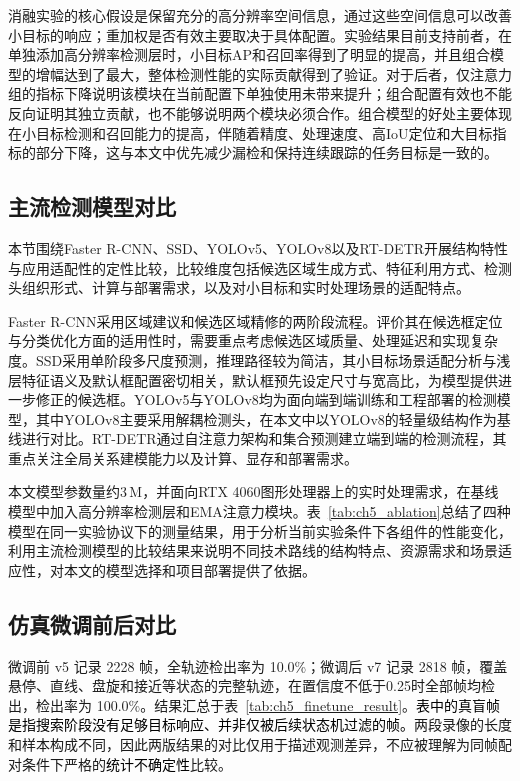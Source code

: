 消融实验的核心假设是保留充分的高分辨率空间信息，通过这些空间信息可以改善小目标的响应；重加权是否有效主要取决于具体配置。实验结果目前支持前者，在单独添加高分辨率检测层时，小目标AP和召回率得到了明显的提高，并且组合模型的增幅达到了最大，整体检测性能的实际贡献得到了验证。对于后者，仅注意力组的指标下降说明该模块在当前配置下单独使用未带来提升；组合配置有效也不能反向证明其独立贡献，也不能够说明两个模块必须合作。组合模型的好处主要体现在小目标检测和召回能力的提高，伴随着精度、处理速度、高IoU定位和大目标指标的部分下降，这与本文中优先减少漏检和保持连续跟踪的任务目标是一致的。

\subsection{主流检测模型对比}
\label{subsec:ch5_mainstream}

本节围绕Faster R-CNN、SSD、YOLOv5、YOLOv8以及RT-DETR开展结构特性与应用适配性的定性比较，比较维度包括候选区域生成方式、特征利用方式、检测头组织形式、计算与部署需求，以及对小目标和实时处理场景的适配特点。

Faster R-CNN采用区域建议和候选区域精修的两阶段流程。评价其在候选框定位与分类优化方面的适用性时，需要重点考虑候选区域质量、处理延迟和实现复杂度。SSD采用单阶段多尺度预测，推理路径较为简洁，其小目标场景适配分析与浅层特征语义及默认框配置密切相关，默认框预先设定尺寸与宽高比，为模型提供进一步修正的候选框。YOLOv5与YOLOv8均为面向端到端训练和工程部署的检测模型，其中YOLOv8主要采用解耦检测头，在本文中以YOLOv8的轻量级结构作为基线进行对比。RT-DETR通过自注意力架构和集合预测建立端到端的检测流程，其重点关注全局关系建模能力以及计算、显存和部署需求。

本文模型参数量约3\,M，并面向RTX 4060图形处理器上的实时处理需求，在基线模型中加入高分辨率检测层和EMA注意力模块。表~\ref{tab:ch5_ablation}总结了四种模型在同一实验协议下的测量结果，用于分析当前实验条件下各组件的性能变化，利用主流检测模型的比较结果来说明不同技术路线的结构特点、资源需求和场景适应性，对本文的模型选择和项目部署提供了依据。

\subsection{仿真微调前后对比}
\label{subsec:ch5_finetune_result}

微调前 v5 记录 2228 帧，全轨迹检出率为 10.0\%；微调后 v7 记录 2818 帧，覆盖悬停、直线、盘旋和接近等状态的完整轨迹，在置信度不低于0.25时全部帧均检出，检出率为 100.0\%。结果汇总于表~\ref{tab:ch5_finetune_result}。\textcolor{black}{表中的真盲帧是指搜索阶段没有足够目标响应、并非仅被后续状态机过滤的帧。}两段录像的长度和样本构成不同，因此两版结果的对比仅用于描述观测差异，不应被理解为同帧配对条件下严格的\textcolor{black}{统计不确定性}比较。

